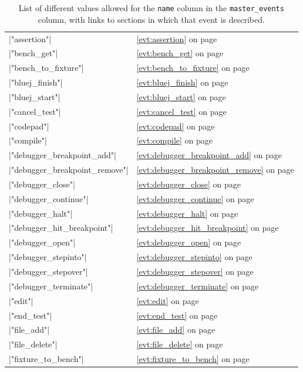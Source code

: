 \documentclass{report}
\newcommand{\myref}[1]{\autoref{#1} on page \pageref*{#1}}
\begin{document}
\begin{table}
\caption[Possible \lstinline!master_events.name! values]{List of different
  values allowed for the \lstinline!name! column in the \lstinline!master_events! column, with
  links to sections in which that event is described.}
\label{tab:event_names}
\begin{center}
\begin{tabular}{p{6cm}@{}l}
|"assertion"| \dotfill & \myref{evt:assertion}\\
|"bench_get"| \dotfill & \myref{evt:bench_get}\\
|"bench_to_fixture"| \dotfill & \myref{evt:bench_to_fixture}\\
|"bluej_finish"| \dotfill & \myref{evt:bluej_finish}\\
|"bluej_start"| \dotfill & \myref{evt:bluej_start}\\
|"cancel_test"| \dotfill & \myref{evt:cancel_test}\\
|"codepad"| \dotfill & \myref{evt:codepad}\\
|"compile"| \dotfill & \myref{evt:compile}\\
|"debugger_breakpoint_add"| \dotfill & \myref{evt:debugger_breakpoint_add}\\
|"debugger_breakpoint_remove"| \dotfill & \myref{evt:debugger_breakpoint_remove}\\
|"debugger_close"| \dotfill & \myref{evt:debugger_close}\\
|"debugger_continue"| \dotfill & \myref{evt:debugger_continue}\\
|"debugger_halt"| \dotfill & \myref{evt:debugger_halt}\\
|"debugger_hit_breakpoint"| \dotfill & \myref{evt:debugger_hit_breakpoint}\\
|"debugger_open"| \dotfill & \myref{evt:debugger_open}\\
|"debugger_stepinto"| \dotfill & \myref{evt:debugger_stepinto}\\
|"debugger_stepover"| \dotfill & \myref{evt:debugger_stepover}\\
|"debugger_terminate"| \dotfill & \myref{evt:debugger_terminate}\\
|"edit"| \dotfill & \myref{evt:edit}\\
|"end_test"| \dotfill & \myref{evt:end_test}\\
|"file_add"| \dotfill & \myref{evt:file_add}\\
|"file_delete"| \dotfill & \myref{evt:file_delete}\\
|"fixture_to_bench"| \dotfill & \myref{evt:fixture_to_bench}\\

\end{tabular}
\end{center}
\end{table}
\end{document}
